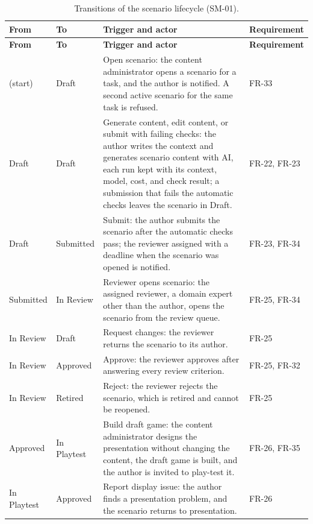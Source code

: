 {\small
\begin{longtable}{|>{\raggedright\arraybackslash}p{}|>{\raggedright\arraybackslash}p{}|>{\raggedright\arraybackslash}p{}|>{\raggedright\arraybackslash}p{}|}
\caption{Transitions of the scenario lifecycle (SM-01).} \\
\hline
\textbf{From} & \textbf{To} & \textbf{Trigger and actor} & \textbf{Requirement} \\ \hline
\endfirsthead
\hline
\textbf{From} & \textbf{To} & \textbf{Trigger and actor} & \textbf{Requirement} \\ \hline
\endhead
(start) & Draft & Open scenario: the content administrator opens a scenario for a task, and the author is notified. A second active scenario for the same task is refused. & FR-33 \\ \hline
Draft & Draft & Generate content, edit content, or submit with failing checks: the author writes the context and generates scenario content with AI, each run kept with its context, model, cost, and check result; a submission that fails the automatic checks leaves the scenario in Draft. & FR-22, FR-23 \\ \hline
Draft & Submitted & Submit: the author submits the scenario after the automatic checks pass; the reviewer assigned with a deadline when the scenario was opened is notified. & FR-23, FR-34 \\ \hline
Submitted & In Review & Reviewer opens scenario: the assigned reviewer, a domain expert other than the author, opens the scenario from the review queue. & FR-25, FR-34 \\ \hline
In Review & Draft & Request changes: the reviewer returns the scenario to its author. & FR-25 \\ \hline
In Review & Approved & Approve: the reviewer approves after answering every review criterion. & FR-25, FR-32 \\ \hline
In Review & Retired & Reject: the reviewer rejects the scenario, which is retired and cannot be reopened. & FR-25 \\ \hline
Approved & In Playtest & Build draft game: the content administrator designs the presentation without changing the content, the draft game is built, and the author is invited to play-test it. & FR-26, FR-35 \\ \hline
In Playtest & Approved & Report display issue: the author finds a presentation problem, and the scenario returns to presentation. & FR-26 \\ \hline

\end{longtable}}
